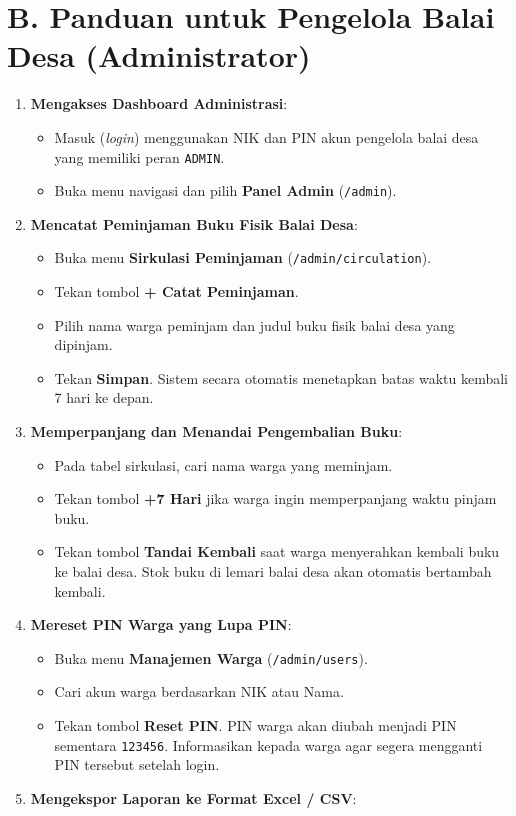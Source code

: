 \documentclass[
  indonesian,
  12pt,
]{report}
\providecommand{\tightlist}{%
  \setlength{\itemsep}{0pt}\setlength{\parskip}{0pt}}
\begin{document}
\section{B. Panduan untuk Pengelola Balai Desa
(Administrator)}\label{b.-panduan-untuk-pengelola-balai-desa-administrator}

\begin{enumerate}
\def\labelenumi{\arabic{enumi}.}
\tightlist
\item
  \textbf{Mengakses Dashboard Administrasi}:

  \begin{itemize}
  \tightlist
  \item
    Masuk (\emph{login}) menggunakan NIK dan PIN akun pengelola balai
    desa yang memiliki peran \texttt{ADMIN}.
  \item
    Buka menu navigasi dan pilih \textbf{Panel Admin} (\texttt{/admin}).
  \end{itemize}
\item
  \textbf{Mencatat Peminjaman Buku Fisik Balai Desa}:

  \begin{itemize}
  \tightlist
  \item
    Buka menu \textbf{Sirkulasi Peminjaman}
    (\texttt{/admin/circulation}).
  \item
    Tekan tombol \textbf{+ Catat Peminjaman}.
  \item
    Pilih nama warga peminjam dan judul buku fisik balai desa yang
    dipinjam.
  \item
    Tekan \textbf{Simpan}. Sistem secara otomatis menetapkan batas waktu
    kembali 7 hari ke depan.
  \end{itemize}
\item
  \textbf{Memperpanjang dan Menandai Pengembalian Buku}:

  \begin{itemize}
  \tightlist
  \item
    Pada tabel sirkulasi, cari nama warga yang meminjam.
  \item
    Tekan tombol \textbf{+7 Hari} jika warga ingin memperpanjang waktu
    pinjam buku.
  \item
    Tekan tombol \textbf{Tandai Kembali} saat warga menyerahkan kembali
    buku ke balai desa. Stok buku di lemari balai desa akan otomatis
    bertambah kembali.
  \end{itemize}
\item
  \textbf{Mereset PIN Warga yang Lupa PIN}:

  \begin{itemize}
  \tightlist
  \item
    Buka menu \textbf{Manajemen Warga} (\texttt{/admin/users}).
  \item
    Cari akun warga berdasarkan NIK atau Nama.
  \item
    Tekan tombol \textbf{Reset PIN}. PIN warga akan diubah menjadi PIN
    sementara \texttt{123456}. Informasikan kepada warga agar segera
    mengganti PIN tersebut setelah login.
  \end{itemize}
\item
  \textbf{Mengekspor Laporan ke Format Excel / CSV}:


\end{enumerate}
\end{document}
